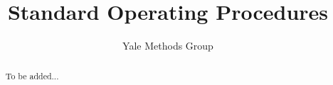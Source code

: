 \author{Yale Methods Group}
\title{Standard Operating Procedures}



\frontmatter

\maketitle

\begin{abstract}
To be added...
\end{abstract}
\clearpage

\tableofcontents*
\clearpage



\mainmatter

%
%
%
